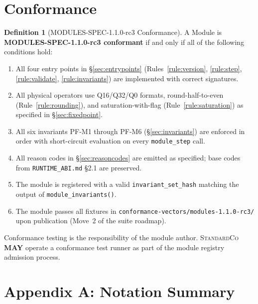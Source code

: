\documentclass[11pt,letterpaper]{article}
\theoremstyle{definition}
\newtheorem{definition}{Definition}[section]
\newcommand{\StandardCo}{\textsc{StandardCo}}
\newcommand{\MAY}{\textbf{MAY}}
\begin{document}
\section{Conformance}
\label{sec:conformance}

\begin{definition}[MODULES-SPEC-1.1.0-rc3 Conformance]
\label{def:conformance}
A Module is \textbf{MODULES-SPEC-1.1.0-rc3 conformant} if and only if all of the following conditions hold:
\begin{enumerate}[label=(\roman*)]
    \item All four entry points in §\ref{sec:entrypoints} (Rules~\ref{rule:version}, \ref{rule:step}, \ref{rule:validate}, \ref{rule:invariants}) are implemented with correct signatures.
    \item All physical operators use Q16/Q32/Q0 formats, round-half-to-even (Rule~\ref{rule:rounding}), and saturation-with-flag (Rule~\ref{rule:saturation}) as specified in §\ref{sec:fixedpoint}.
    \item All six invariants PF-M1 through PF-M6 (§\ref{sec:invariants}) are enforced in order with short-circuit evaluation on every \texttt{module\_step} call.
    \item All reason codes in §\ref{sec:reasoncodes} are emitted as specified; base codes from \texttt{RUNTIME\_ABI.md} §2.1 are preserved.
    \item The module is registered with a valid \texttt{invariant\_set\_hash} matching the output of \texttt{module\_invariants()}.
    \item The module passes all fixtures in \texttt{conformance-vectors/modules-1.1.0-rc3/} upon publication (Move~2 of the suite roadmap).
\end{enumerate}
\end{definition}

Conformance testing is the responsibility of the module author. \StandardCo{} \MAY{} operate a conformance test runner as part of the module registry admission process.

\section*{Appendix A: Notation Summary}
\label{app:notation}
\end{document}
